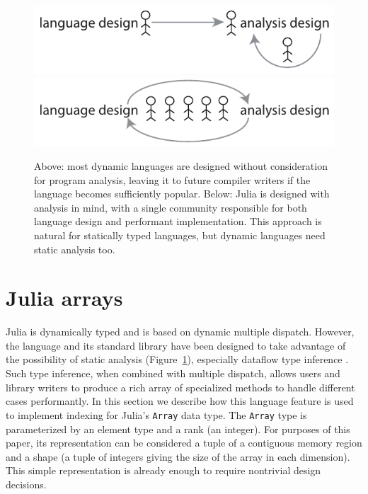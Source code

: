 \documentclass[preprint]{sigplanconf}
\newcommand{\code}[1]{\texttt{#1}}
\begin{document}


\begin{figure}
  \centering
  \includegraphics[width=\columnwidth]{fig-design-old}
  \includegraphics[width=\columnwidth]{fig-design-new}
  \caption{\label{fig:langdesign}
Above: most dynamic languages are designed without consideration for program
analysis, leaving it to future compiler writers if the language becomes
sufficiently popular.
Below: Julia is designed with analysis in mind, with a single community responsible
for both language design and performant implementation. This approach is
natural for statically typed languages, but dynamic languages need static analysis too.}
\end{figure}

\section{Julia arrays}

Julia\cite{Bezanson:2012jf} is dynamically typed and is based on dynamic
multiple dispatch. However, the language and its standard library have been
designed to take advantage of the possibility of static analysis
(Figure~\ref{fig:langdesign}), especially dataflow type inference \cite{Cousot:1977, kaplanullman}. Such type
inference, when combined with multiple dispatch, allows users and library
writers to produce a rich array of specialized methods to handle different
cases performantly. In this section we describe how this language feature
is used to implement indexing for Julia's \code{Array} data type.
The \code{Array} type is parameterized by an element type and a rank (an
integer). For purposes of this paper, its representation can be considered a
tuple of a contiguous memory region and a shape (a tuple of integers giving
the size of the array in each dimension). This simple representation is
already enough to require nontrivial design decisions.
\end{document}
